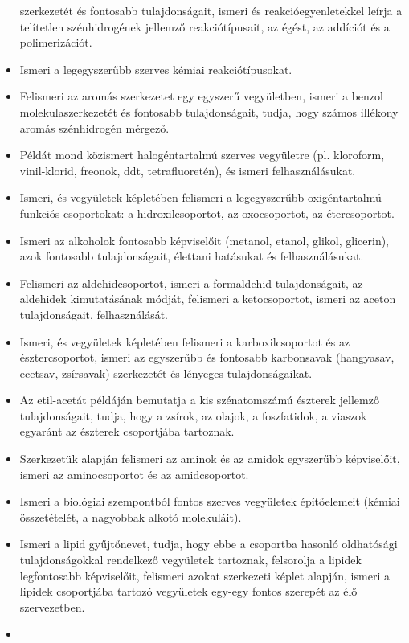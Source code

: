 \begin{itemize}
  szerkezetét és fontosabb tulajdonságait, ismeri és
  reakcióegyenletekkel leírja a telítetlen szénhidrogének jellemző
  reakciótípusait, az égést, az addíciót és a polimerizációt.
\item
  Ismeri a legegyszerűbb szerves kémiai reakciótípusokat.
\item
  Felismeri az aromás szerkezetet egy egyszerű vegyületben, ismeri a
  benzol molekulaszerkezetét és fontosabb tulajdonságait, tudja, hogy
  számos illékony aromás szénhidrogén mérgező.
\item
  Példát mond közismert halogéntartalmú szerves vegyületre (pl.
  kloroform, vinil-klorid, freonok, ddt, tetrafluoretén), és ismeri
  felhasználásukat.
\item
  Ismeri, és vegyületek képletében felismeri a legegyszerűbb
  oxigéntartalmú funkciós csoportokat: a hidroxilcsoportot, az
  oxocsoportot, az étercsoportot.
\item
  Ismeri az alkoholok fontosabb képviselőit (metanol, etanol, glikol,
  glicerin), azok fontosabb tulajdonságait, élettani hatásukat és
  felhasználásukat.
\item
  Felismeri az aldehidcsoportot, ismeri a formaldehid tulajdonságait, az
  aldehidek kimutatásának módját, felismeri a ketocsoportot, ismeri az
  aceton tulajdonságait, felhasználását.
\item
  Ismeri, és vegyületek képletében felismeri a karboxilcsoportot és az
  észtercsoportot, ismeri az egyszerűbb és fontosabb karbonsavak
  (hangyasav, ecetsav, zsírsavak) szerkezetét és lényeges
  tulajdonságaikat.
\item
  Az etil-acetát példáján bemutatja a kis szénatomszámú észterek
  jellemző tulajdonságait, tudja, hogy a zsírok, az olajok, a
  foszfatidok, a viaszok egyaránt az észterek csoportjába tartoznak.
\item
  Szerkezetük alapján felismeri az aminok és az amidok egyszerűbb
  képviselőit, ismeri az aminocsoportot és az amidcsoportot.
\item
  Ismeri a biológiai szempontból fontos szerves vegyületek építőelemeit
  (kémiai összetételét, a nagyobbak alkotó molekuláit).
\item
  Ismeri a lipid gyűjtőnevet, tudja, hogy ebbe a csoportba hasonló
  oldhatósági tulajdonságokkal rendelkező vegyületek tartoznak,
  felsorolja a lipidek legfontosabb képviselőit, felismeri azokat
  szerkezeti képlet alapján, ismeri a lipidek csoportjába tartozó
  vegyületek egy-egy fontos szerepét az élő szervezetben.
\item

\end{itemize}
